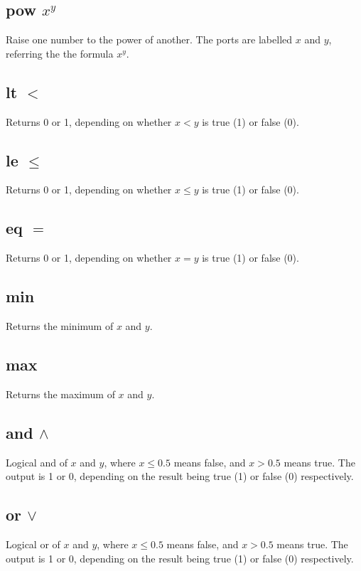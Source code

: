 \subsection{pow $x^y$}\label{Operation:pow} Raise one number to the power of another. The
ports are labelled $x$ and $y$, referring the the formula $x^y$.

\subsection{lt $<$}\label{Operation:lt} Returns 0 or 1, depending
  on whether $x<y$ is true (1) or false (0).

\subsection{le $\le$}\label{Operation:le} Returns 0 or 1, depending
  on whether $x\le y$ is true (1) or false (0).

\subsection{eq $=$}\label{Operation:eq} Returns 0 or 1, depending
  on whether $x=y$ is true (1) or false (0).

\subsection{min}\label{Operation:min} Returns the minimum of $x$ and $y$.

\subsection{max}\label{Operation:max} Returns the maximum of $x$ and $y$.

\subsection{and $\wedge$}\label{Operation:and_} Logical and of $x$ and $y$, where
  $x\le 0.5$
  means false, and $x>0.5$ means true. The output is 1 or 0, depending
  on the result being true (1) or false (0) respectively.

\subsection{or $\vee$}\label{Operation:or_} Logical or of $x$ and $y$, where $x\le0.5$
  means false, and $x>0.5$ means true. The output is 1 or 0, depending
  on the result being true (1) or false (0) respectively.

